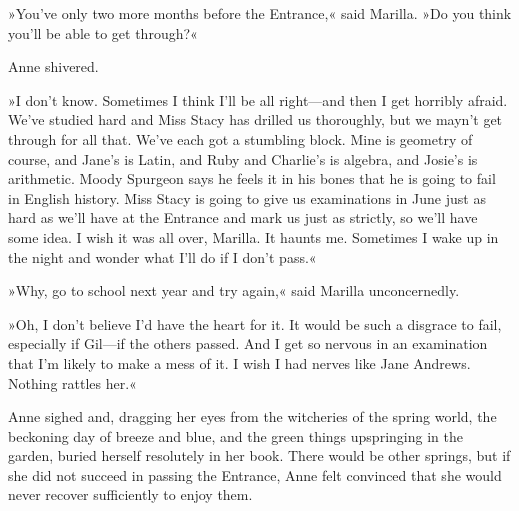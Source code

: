 »You've only two more months before the Entrance,« said Marilla. »Do you think you'll be able to get through?«

Anne shivered.

»I don't know. Sometimes I think I'll be all right—and then I get horribly afraid. We've studied hard and Miss Stacy has drilled us thoroughly, but we mayn't get through for all that. We've each got a stumbling block. Mine is geometry of course, and Jane's is Latin, and Ruby and Charlie's is algebra, and Josie's is arithmetic. Moody Spurgeon says he feels it in his bones that he is going to fail in English history. Miss Stacy is going to give us examinations in June just as hard as we'll have at the Entrance and mark us just as strictly, so we'll have some idea. I wish it was all over, Marilla. It haunts me. Sometimes I wake up in the night and wonder what I'll do if I don't pass.«

»Why, go to school next year and try again,« said Marilla unconcernedly.

»Oh, I don't believe I'd have the heart for it. It would be such a disgrace to fail, especially if Gil—if the others passed. And I get so nervous in an examination that I'm likely to make a mess of it. I wish I had nerves like Jane Andrews. Nothing rattles her.«

Anne sighed and, dragging her eyes from the witcheries of the spring world, the beckoning day of breeze and blue, and the green things upspringing in the garden, buried herself resolutely in her book. There would be other springs, but if she did not succeed in passing the Entrance, Anne felt convinced that she would never recover sufficiently to enjoy them.